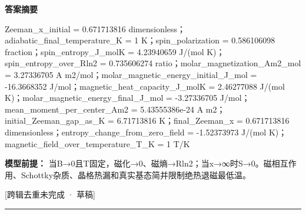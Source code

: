 \documentclass[UTF8,11pt,a4paper]{ctexart}
\begin{document}
\noindent\textbf{答案摘要}\par
Zeeman\_x\_initial = 0.671713816 dimensionless；adiabatic\_final\_temperature\_K = 1 K；spin\_polarization = 0.586106098 fraction；spin\_entropy\_J\_molK = 4.23940659 J/(mol K)；spin\_entropy\_over\_Rln2 = 0.735606274 ratio；molar\_magnetization\_Am2\_mol = 3.27336705 A m2/mol；molar\_magnetic\_energy\_initial\_J\_mol = -16.3668352 J/mol；magnetic\_heat\_capacity\_J\_molK = 2.46277088 J/(mol K)；molar\_magnetic\_energy\_final\_J\_mol = -3.27336705 J/mol；mean\_moment\_per\_center\_Am2 = 5.43555386e-24 A m2；initial\_Zeeman\_gap\_as\_K = 6.71713816 K；final\_Zeeman\_x = 0.671713816 dimensionless；entropy\_change\_from\_zero\_field = -1.52373973 J/(mol K)；magnetic\_field\_over\_temperature\_T\_K = 1 T/K\par
\noindent\textbf{模型前提：}
当B→0且T固定，磁化→0、磁熵→Rln2；当x→∞时S→0。磁相互作用、Schottky杂质、晶格热漏和真实基态简并限制绝热退磁最低温。\par
\noindent\textcolor{red!65!black}{[跨辑去重未完成 · 草稿]} \par
\medskip\hrule\medskip
{}
\end{document}
